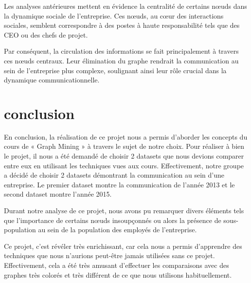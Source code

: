 \documentclass{article}
\begin{document}
Les analyses antérieures mettent en évidence la centralité de certains nœuds dans la dynamique sociale de l'entreprise. Ces nœuds, au cœur des interactions sociales, semblent correspondre à des postes à haute responsabilité tels que des CEO ou des chefs de projet.

Par conséquent, la circulation des informations se fait principalement à travers ces nœuds centraux. Leur élimination du graphe rendrait la communication au sein de l'entreprise plus complexe, soulignant ainsi leur rôle crucial dans la dynamique communicationnelle.

\section{conclusion}

En conclusion, la réalisation de ce projet nous a permis d’aborder les concepts du cours de « Graph Mining » à travers le sujet de notre choix. Pour réaliser à bien le projet, il nous a été demandé de choisir 2 datasets que nous devions comparer entre eux en utilisant les techniques vues aux cours. Effectivement, notre groupe a décidé de choisir 2 datasets démontrant la communication au sein d’une entreprise. Le premier dataset montre la communication de l’année 2013 et le second dataset montre l’année 2015.

Durant notre analyse de ce projet, nous avons pu remarquer divers éléments tels que l’importance de certains nœuds insoupçonnés ou alors la présence de sous-population au sein de la population des employés de l’entreprise.

Ce projet, c’est révéler très enrichissant, car cela nous a permis d’apprendre des techniques que nous n’aurions peut-être jamais utilisées sans ce projet. Effectivement, cela a été très amusant d’effectuer les comparaisons avec des graphes très colorés et très différent de ce que nous utilisons habituellement.
\end{document}
